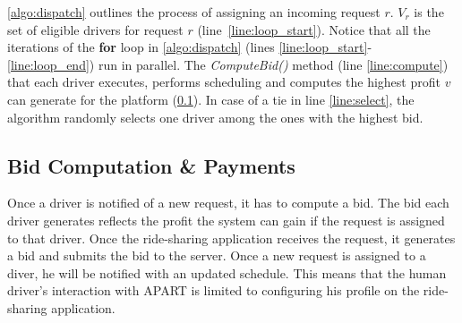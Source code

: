 \cref{algo:dispatch} outlines the process of assigning an incoming request $r$. $V_r$ is the set of eligible drivers for request $r$ (line~\ref{line:loop_start}). Notice that all the iterations of the \textbf{for} loop in \cref{algo:dispatch} (lines \ref{line:loop_start}-\ref{line:loop_end}) run in parallel. The \emph{ComputeBid()} method (line \ref{line:compute}) that each driver executes, performs scheduling and computes the highest profit $v$ can generate for the platform (\cref{subsec:bidcomp}). In case of a tie in line \ref{line:select}, the algorithm randomly selects one driver among the ones with the highest bid.

\subsection{Bid Computation \& Payments}
\label{subsec:bidcomp}

Once a driver is notified of a new request, it has to compute a bid. The bid each driver generates reflects the profit the system can gain if the request is assigned to that driver. Once the ride-sharing application receives the request, it generates a bid and submits the bid to the server. Once a new request is assigned to a diver, he will be notified with an updated schedule. This means that the human driver's interaction with APART is limited to configuring his profile on the ride-sharing application.

